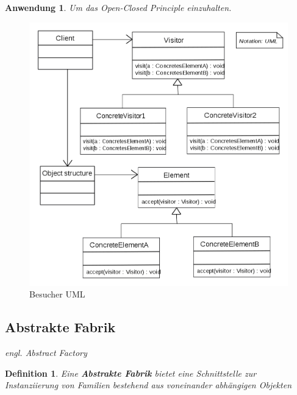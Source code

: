\documentclass[a4paper]{article}
\theoremstyle{break}
\newtheorem{defi}{Definition}[section]
\newtheorem{why}{Anwendung}[section]
\begin{document}
\begin{why}
	Um das Open-Closed Principle einzuhalten.
\end{why}
\begin{figure}[H]
	\centering
	\includegraphics[width=\textwidth]{../diagrams/uml/VisitorPattern.png}
	\caption{Besucher UML}
\end{figure}




\newpage
\subsection{Abstrakte Fabrik}

\textit{engl. Abstract Factory}

\begin{defi}
	Eine \textbf{Abstrakte Fabrik} bietet eine Schnittstelle zur Instanziierung von Familien bestehend aus voneinander abhängigen Objekten
\end{defi}
\end{document}

